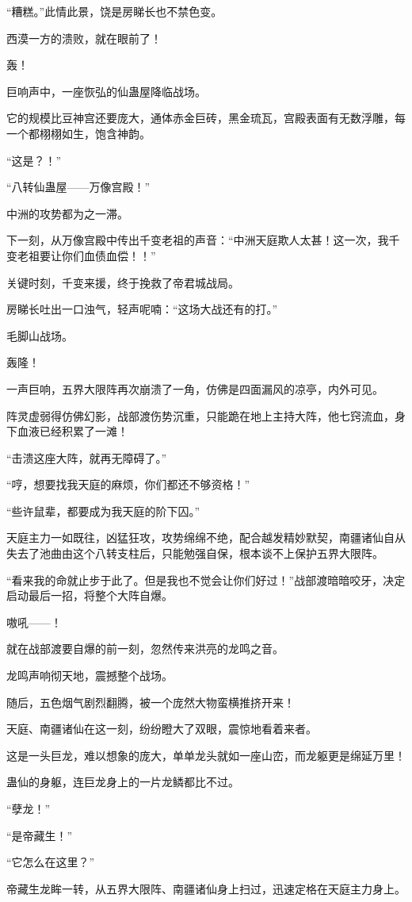 \begin{this_body}
“糟糕。”此情此景，饶是房睇长也不禁色变。

西漠一方的溃败，就在眼前了！

轰！

巨响声中，一座恢弘的仙蛊屋降临战场。

它的规模比豆神宫还要庞大，通体赤金巨砖，黑金琉瓦，宫殿表面有无数浮雕，每一个都栩栩如生，饱含神韵。

“这是？！”

“八转仙蛊屋——万像宫殿！”

中洲的攻势都为之一滞。

下一刻，从万像宫殿中传出千变老祖的声音：“中洲天庭欺人太甚！这一次，我千变老祖要让你们血债血偿！！”

关键时刻，千变来援，终于挽救了帝君城战局。

房睇长吐出一口浊气，轻声呢喃：“这场大战还有的打。”

毛脚山战场。

轰隆！

一声巨响，五界大限阵再次崩溃了一角，仿佛是四面漏风的凉亭，内外可见。

阵灵虚弱得仿佛幻影，战部渡伤势沉重，只能跪在地上主持大阵，他七窍流血，身下血液已经积累了一滩！

“击溃这座大阵，就再无障碍了。”

“哼，想要找我天庭的麻烦，你们都还不够资格！”

“些许鼠辈，都要成为我天庭的阶下囚。”

天庭主力一如既往，凶猛狂攻，攻势绵绵不绝，配合越发精妙默契，南疆诸仙自从失去了池曲由这个八转支柱后，只能勉强自保，根本谈不上保护五界大限阵。

“看来我的命就止步于此了。但是我也不觉会让你们好过！”战部渡暗暗咬牙，决定启动最后一招，将整个大阵自爆。

嗷吼——！

就在战部渡要自爆的前一刻，忽然传来洪亮的龙鸣之音。

龙鸣声响彻天地，震撼整个战场。

随后，五色烟气剧烈翻腾，被一个庞然大物蛮横推挤开来！

天庭、南疆诸仙在这一刻，纷纷瞪大了双眼，震惊地看着来者。

这是一头巨龙，难以想象的庞大，单单龙头就如一座山峦，而龙躯更是绵延万里！

蛊仙的身躯，连巨龙身上的一片龙鳞都比不过。

“孽龙！”

“是帝藏生！”

“它怎么在这里？”

帝藏生龙眸一转，从五界大限阵、南疆诸仙身上扫过，迅速定格在天庭主力身上。


\end{this_body}
